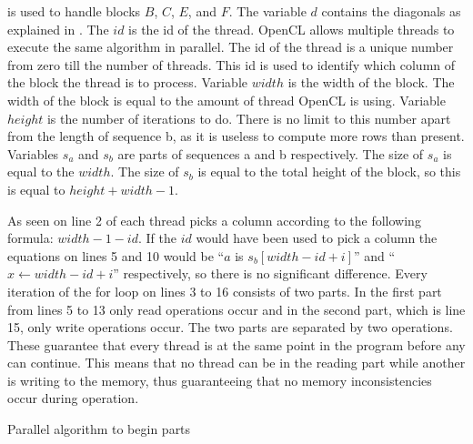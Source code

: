  is used to handle blocks $B$, $C$, $E$, and $F$.
The variable $d$ contains the diagonals as explained in .
The $id$ is the id of the thread.
OpenCL allows multiple threads to execute the same algorithm in parallel.
The id of the thread is a unique number from zero till the number of threads.
This id is used to identify which column of the block the thread is to process.
Variable $width$ is the width of the block.
The width of the block is equal to the amount of thread OpenCL is using.
Variable $height$ is the number of iterations to do.
There is no limit to this number apart from the length of sequence b, as it is useless to compute more rows than present.
Variables $s_a$ and $s_b$ are parts of sequences a and b respectively.
The size of $s_a$ is equal to the $width$.
The size of $s_b$ is equal to the total height of the block, so this is equal to $height + width - 1$.

As seen on line 2 of  each thread picks a column according to the following formula: $width - 1 - id$.
If the $id$ would have been used to pick a column the equations on lines 5 and 10 would be ``$a$ is $s_b[width - id + i]$'' and ``$x \gets width - id + i$'' respectively, so there is no significant difference.
Every iteration of the for loop on lines 3 to 16 consists of two parts.
In the first part from lines 5 to 13 only read operations occur and in the second part, which is line 15, only write operations occur.
The two parts are separated by two  operations.
These guarantee that every thread is at the same point in the program before any can continue.
This means that no thread can be in the reading part while another is writing to the memory, thus guaranteeing that no memory inconsistencies occur during operation.

\begin{algorithm}
\caption{Parallel algorithm to begin parts} \label{begin}
\begin{algorithmic}[1]
    \Statex
    \EndIf
    \Statex
            \Statex
            \Else
            \EndIf
            \Statex
            \Statex
            \Statex
        \Else
        \EndIf
    \EndFor
\EndProcedure
\end{algorithmic}
\end{algorithm}

